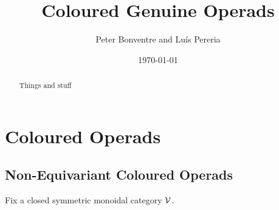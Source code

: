 \documentclass[psamsfonts,onesided,10pt
,draft
]{amsart}%
\title{Coloured Genuine Operads}%
\author{Peter Bonventre and Lu\'is Pereria}
\date{\today}
\begin{document}
\begin{abstract}
      Things and stuff
\end{abstract}

\maketitle

\tableofcontents


\section{Coloured Operads}


\subsection{Non-Equivariant Coloured Operads}


Fix a closed symmetric monoidal category $\mathcal V$.
\end{document}
